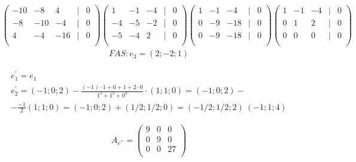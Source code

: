 \documentclass[12pt]{article}
\begin{document}
\begin{gather*}
	\begin{pmatrix}
		-10 & -8 & 4 & | & 0 \\
		-8 & -10 & -4 & | & 0 \\
		4& -4 & -16 & | & 0 \\
	\end{pmatrix}
	\begin{pmatrix}
		1 & -1 & -4 & | & 0 \\
		-4 & -5 & -2 & | & 0 \\
		-5 & -4 & 2 & | & 0 \\
	\end{pmatrix}
	\begin{pmatrix}
		1 & -1 & -4 & | & 0 \\
		0 & -9 & -18 & | & 0 \\
		0 & -9 & -18 & | & 0 \\
	\end{pmatrix}
	\begin{pmatrix}
		1 & -1 & -4 & | & 0 \\
		0 & 1 & 2 & | & 0 \\
		0 & 0 & 0 & | & 0 \\
	\end{pmatrix}
\end{gather*}
\begin{gather*}
	FAS: %
	e_3 = (2; -2; 1)
\end{gather*}



\begin{gather*}
	e_1^{'} = e_1 \\
	e_2^{'} = (-1;0;2) - \frac{(-1) \cdot 1 + 0 + 1 + 2 \cdot 0}{1^2 + 1^2 + 0^2} \cdot (1;1;0) = (-1; 0; 2) - \\
	- \frac{-1}{2} (1;1;0) = (-1;0;2) + (1/2;1/2;0) = (-1/2; 1/2; 2) ~ (-1;1;4) %
\end{gather*}


\begin{gather*}
	A_{e^{'''}} =
	\begin{pmatrix}
		9 & 0 & 0 \\
		0 & 9 & 0  \\
		0 & 0 & 27 \\
	\end{pmatrix}
\end{gather*}


\pagebreak
\end{document}
